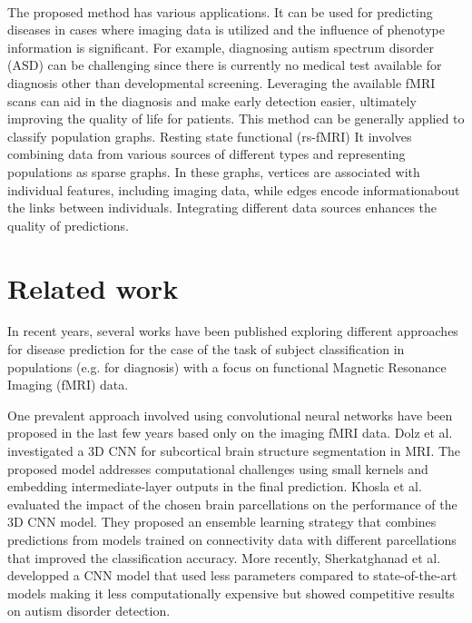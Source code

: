 \documentclass[sigconf]{acmart}
\begin{document}
\paragraph{} The proposed method has various applications. 
It can be used for predicting diseases in cases where imaging data is utilized and the influence of phenotype information is significant. For example, diagnosing autism spectrum disorder (ASD) can be challenging since there is currently 
no medical test available for diagnosis other than developmental screening. Leveraging the available fMRI scans can aid in the diagnosis and make early detection easier, ultimately improving the quality of life for patients. 
This method can be generally applied to classify population graphs. 
Resting state functional (rs-fMRI) %
It involves combining data from various sources of different types and representing populations as sparse graphs. In these graphs, vertices are associated with individual features, including imaging data, while edges encode informationabout the links between individuals. Integrating different data sources enhances the quality of predictions.

\section{Related work}
In recent years, several works have been published exploring different approaches for disease prediction for the case of the task of subject classification in populations (e.g. for diagnosis) with a focus on functional Magnetic Resonance Imaging (fMRI) data.

One prevalent approach involved using convolutional neural networks have been proposed in the last few years based only on the imaging fMRI data. Dolz et al. \cite{Dolz2018} investigated a 3D CNN for subcortical brain structure segmentation in MRI. The proposed model addresses computational challenges using small kernels and embedding intermediate-layer outputs in the final prediction. Khosla et al.\cite{Khosla2019} evaluated the impact of the chosen brain parcellations on the performance of the 3D CNN model. They proposed an ensemble learning strategy that combines predictions from models trained on connectivity data with different parcellations that improved the classification accuracy. More recently, Sherkatghanad et al. developped a CNN model that used less parameters compared to state-of-the-art models making it less computationally expensive but showed competitive results on autism disorder detection.
\end{document}
